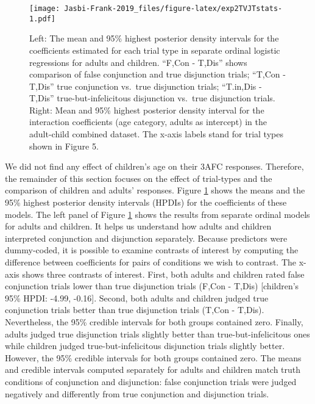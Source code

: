 \documentclass[
  english,
  ,man,floatsintext]{apa6}
\begin{document}
\begin{figure}
\centering
\texttt{[image: Jasbi-Frank-2019\_files/figure-latex/exp2TVJTstats-1.pdf]}
\caption{\label{fig:exp2TVJTstats}Left: The mean and 95\% highest posterior density intervals for the coefficients estimated for each trial type in separate ordinal logistic regressions for adults and children. \enquote{F,Con - T,Dis} shows comparison of false conjunction and true disjunction trials; \enquote{T,Con - T,Dis} true conjunction vs.~true disjunction trials; \enquote{T.in,Dis - T,Dis} true-but-infelicitous disjunction vs.~true disjunction trials. Right: Mean and 95\% highest posterior density interval for the interaction coefficients (age category, adults as intercept) in the adult-child combined dataset. The x-axis labels stand for trial types shown in Figure 5.}
\end{figure}

We did not find any effect of children's age on their 3AFC responses. Therefore, the remainder of this section focuses on the effect of trial-types and the comparison of children and adults' responses. Figure \ref{fig:exp2TVJTstats} shows the means and the 95\% highest posterior density intervals (HPDIs) for the coefficients of these models. The left panel of Figure \ref{fig:exp2TVJTstats} shows the results from separate ordinal models for adults and children. It helps us understand how adults and children interpreted conjunction and disjunction separately. Because predictors were dummy-coded, it is possible to examine contrasts of interest by computing the difference between coefficients for pairs of conditions we wish to contrast. The x-axis shows three contrasts of interest. First, both adults and children rated false conjunction trials lower than true disjunction trials (F,Con - T,Dis) {[}children's 95\% HPDI: -4.99,
-0.16{]}. Second, both adults and children judged true conjunction trials better than true disjunction trials (T,Con - T,Dis). Nevertheless, the 95\% credible intervals for both groups contained zero. Finally, adults judged true disjunction trials slightly better than true-but-infelicitous ones while children judged true-but-infelicitous disjunction trials slightly better. However, the 95\% credible intervals for both groups contained zero. The means and credible intervals computed separately for adults and children match truth conditions of conjunction and disjunction: false conjunction trials were judged negatively and differently from true conjunction and disjunction trials.
\end{document}
